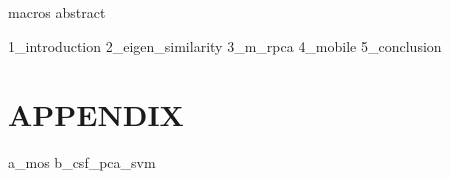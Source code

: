 \documentclass[12pt,oneside,english]{book}
\begin{document}




\runfrontend{}

{macros}
{abstract}

\sumario

\listadefiguras



	\listadesimbolos

	\listadeacronimos

	\listadenotacoes

\markboth{}{}

\mainmatter 
\setcounter{page}{1} \pagestyle{plain} 

{1_introduction}
{2_eigen_similarity}
{3_m_rpca}
{4_mobile}
{5_conclusion}

%
%




\part*{APPENDIX}
\appendix
{a_mos}
{b_csf_pca_svm}
\end{document}

